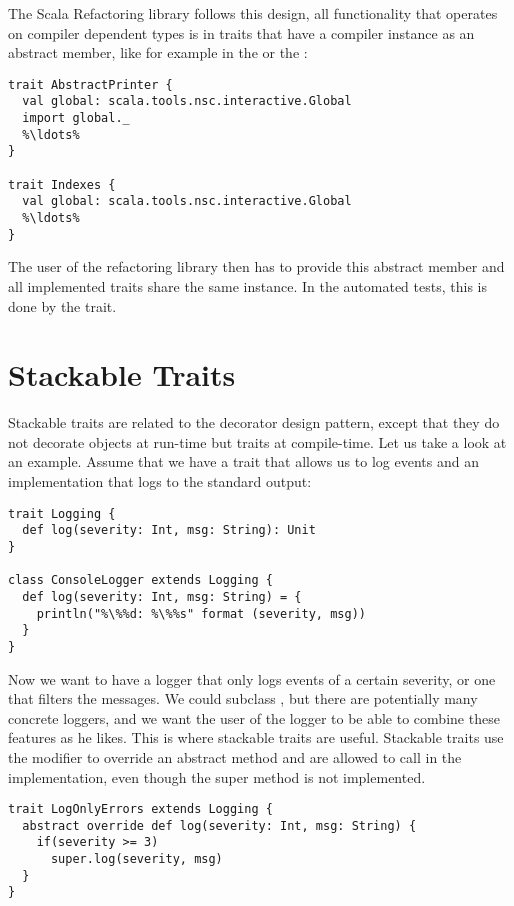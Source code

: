 The Scala Refactoring library follows this design, all functionality that operates on compiler dependent types is in traits that have a compiler instance as an abstract member, like for example in the  or the :

\begin{lstlisting}
trait AbstractPrinter {
  val global: scala.tools.nsc.interactive.Global
  import global._
  %\ldots%
}

trait Indexes {
  val global: scala.tools.nsc.interactive.Global
  %\ldots%
}
\end{lstlisting}

The user of the refactoring library then has to provide this abstract member and all implemented traits share the same instance. In the automated tests, this is done by the  trait.

\section{Stackable Traits} \label{section:stackable-traits}

Stackable traits are related to the decorator design pattern, except that they do not decorate objects at run-time but traits at compile-time. Let us take a look at an example. Assume that we have a trait that allows us to log events and an implementation that logs to the standard output:

\begin{lstlisting}
trait Logging {
  def log(severity: Int, msg: String): Unit
}

class ConsoleLogger extends Logging {
  def log(severity: Int, msg: String) = {
    println("%\%%d: %\%%s" format (severity, msg))
  }
}
\end{lstlisting}

Now we want to have a logger that only logs events of a certain severity, or one that filters the messages. We could subclass , but there are potentially many concrete loggers, and we want the user of the logger to be able to combine these features as he likes. This is where stackable traits are useful. Stackable traits use the  modifier to override an abstract method and are allowed to call  in the implementation, even though the super method is not implemented.

\begin{lstlisting}
trait LogOnlyErrors extends Logging {
  abstract override def log(severity: Int, msg: String) {
    if(severity >= 3)
      super.log(severity, msg)
  }
}
\end{lstlisting}

